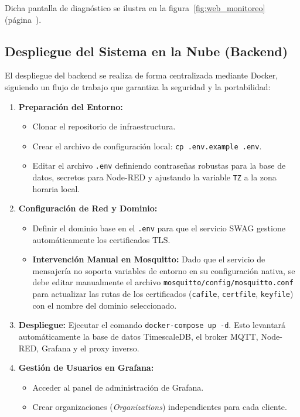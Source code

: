\documentclass[12pt, a4paper]{article} %
\begin{document}
Dicha pantalla de diagnóstico se ilustra en la figura~\ref{fig:web_monitoreo} (página~\pageref{fig:web_monitoreo}).

\subsection{Despliegue del Sistema en la Nube (Backend)}

El despliegue del backend se realiza de forma centralizada mediante Docker, siguiendo un flujo de trabajo que garantiza la seguridad y la portabilidad:

\begin{enumerate}
  \item \textbf{Preparación del Entorno:}
    \begin{itemize}
      \item Clonar el repositorio de infraestructura.
      \item Crear el archivo de configuración local: \texttt{cp .env.example .env}.
      \item Editar el archivo \texttt{.env} definiendo contraseñas robustas para la base de datos, secretos para Node-RED y ajustando la variable \texttt{TZ} a la zona horaria local.
    \end{itemize}
  \item \textbf{Configuración de Red y Dominio:}
    \begin{itemize}
      \item Definir el dominio base en el \texttt{.env} para que el servicio SWAG gestione automáticamente los certificados TLS.
      \item \textbf{Intervención Manual en Mosquitto:} Dado que el servicio de mensajería no soporta variables de entorno en su configuración nativa, se debe editar manualmente el archivo \texttt{mosquitto/config/mosquitto.conf} para actualizar las rutas de los certificados (\texttt{cafile}, \texttt{certfile}, \texttt{keyfile}) con el nombre del dominio seleccionado.
    \end{itemize}
  \item \textbf{Despliegue:} Ejecutar el comando \texttt{docker-compose up -d}. Esto levantará automáticamente la base de datos TimescaleDB, el broker MQTT, Node-RED, Grafana y el proxy inverso.
  \item \textbf{Gestión de Usuarios en Grafana:}
    \begin{itemize}
      \item Acceder al panel de administración de Grafana.
      \item Crear organizaciones (\textit{Organizations}) independientes para cada cliente.

\end{itemize}
\end{enumerate}
\end{document}

